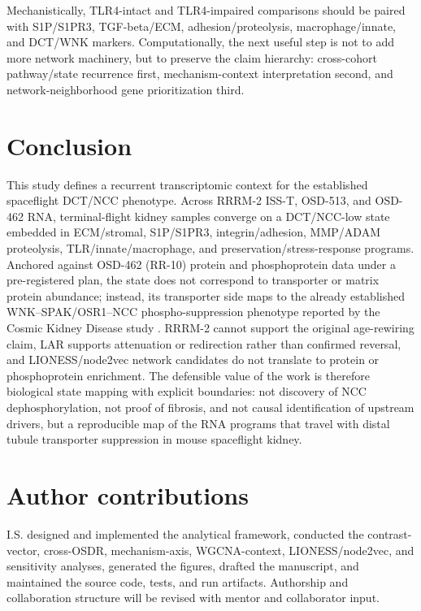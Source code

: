 \documentclass[11pt]{article}
\begin{document}
Mechanistically, TLR4-intact and TLR4-impaired comparisons should be paired with S1P/S1PR3, TGF-beta/ECM, adhesion/proteolysis, macrophage/innate, and DCT/WNK markers. Computationally, the next useful step is not to add more network machinery, but to preserve the claim hierarchy: cross-cohort pathway/state recurrence first, mechanism-context interpretation second, and network-neighborhood gene prioritization third.

\section{Conclusion}

This study defines a recurrent transcriptomic context for the established spaceflight DCT/NCC phenotype. Across RRRM-2 ISS-T, OSD-513, and OSD-462 RNA, terminal-flight kidney samples converge on a DCT/NCC-low state embedded in ECM/stromal, S1P/S1PR3, integrin/adhesion, MMP/ADAM proteolysis, TLR/innate/macrophage, and preservation/stress-response programs. Anchored against OSD-462 (RR-10) protein and phosphoprotein data under a pre-registered plan, the state does not correspond to transporter or matrix protein abundance; instead, its transporter side maps to the already established WNK--SPAK/OSR1--NCC phospho-suppression phenotype reported by the Cosmic Kidney Disease study \citep{siew2024cosmic}. RRRM-2 cannot support the original age-rewiring claim, LAR supports attenuation or redirection rather than confirmed reversal, and LIONESS/node2vec network candidates do not translate to protein or phosphoprotein enrichment. The defensible value of the work is therefore biological state mapping with explicit boundaries: not discovery of NCC dephosphorylation, not proof of fibrosis, and not causal identification of upstream drivers, but a reproducible map of the RNA programs that travel with distal tubule transporter suppression in mouse spaceflight kidney.

\section*{Author contributions}
I.S. designed and implemented the analytical framework, conducted the contrast-vector, cross-OSDR, mechanism-axis, WGCNA-context, LIONESS/node2vec, and sensitivity analyses, generated the figures, drafted the manuscript, and maintained the source code, tests, and run artifacts. Authorship and collaboration structure will be revised with mentor and collaborator input.
\end{document}
